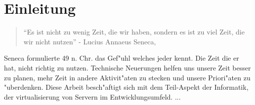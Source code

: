 \chapter{Einleitung}

\begin{quote}
	``Es ist nicht zu wenig Zeit, die wir haben, sondern es ist zu viel Zeit, die wir nicht nutzen'' - Lucius Annaeus Seneca, \cite{Apelt200511}
\end{quote}
Seneca formulierte  49 n. Chr. das Gef"uhl welches jeder kennt. Die Zeit die er hat, nicht richtig zu nutzen.
Technische Neuerungen helfen uns unsere Zeit besser zu planen, mehr Zeit in andere Aktivit"aten zu stecken und unsere Priori"aten zu "uberdenken.
Diese Arbeit besch"aftigt sich mit dem Teil-Aspekt der Informatik, der virtualisierung von Servern im Entwicklungsumfeld.\newline
...

